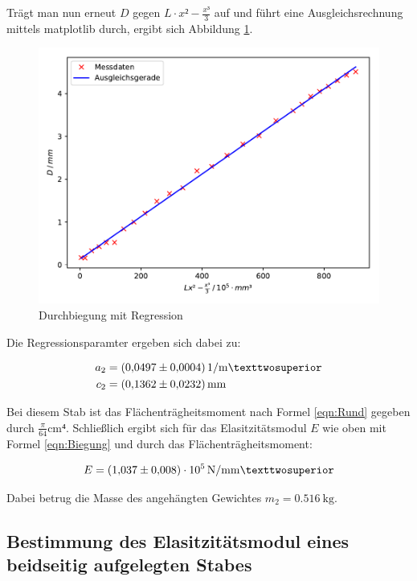 Trägt man nun erneut $D$ gegen $L\cdot x²-\frac{x³}{3}$ auf und führt eine
Ausgleichsrechnung mittels matplotlib durch, ergibt sich Abbildung \ref{fig:plot2}. 

\begin{figure}
  \centering
  \includegraphics[scale=0.8]{content/plot2.pdf}
  \caption{Durchbiegung mit Regression}
  \label{fig:plot2}
\end{figure}

Die Regressionsparamter ergeben sich dabei zu: 

\begin{align*}
a_2 &= \SI{0.0497+-0.0004}{1\per\meter²}\\ 
c_2 &= \SI{0.1362+-0.0232}{\milli\meter}
\end{align*}

Bei diesem Stab ist das Flächenträgheitsmoment nach Formel \eqref{eqn:Rund}
gegeben durch $\frac{\pi}{64}\si{\centi\meter⁴}$.
Schließlich ergibt sich für das Elasitzitätsmodul $E$ wie oben mit Formel 
\eqref{eqn:Biegung} und durch das Flächenträgheitsmoment:

\begin{equation*}
E = \SI{1.037+-0.008e5}{\newton\per\milli\meter²}
\end{equation*}

Dabei betrug die Masse des angehängten Gewichtes $m_2 = \SI{0.516}{\kilo\gram}$.

\subsection{Bestimmung des Elasitzitätsmodul eines beidseitig aufgelegten Stabes}

